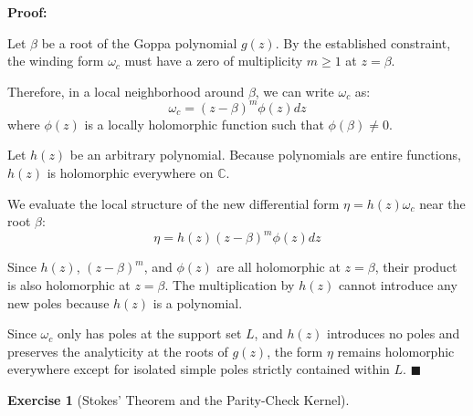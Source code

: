 \documentclass[11pt]{article}
\newtheorem{problem}{Exercise}
\begin{document}
	\begin{mdframed}[backgroundcolor=gray!5, linecolor=gray!50, linewidth=1pt]
		\textbf{Proof:}
		
		Let $\beta$ be a root of the Goppa polynomial $g(z)$. By the established constraint, the winding form $\omega_c$ must have a zero of multiplicity $m \geq 1$ at $z = \beta$. 
		
		Therefore, in a local neighborhood around $\beta$, we can write $\omega_c$ as:
		$$ \omega_c = (z - \beta)^m \phi(z) dz $$
		where $\phi(z)$ is a locally holomorphic function such that $\phi(\beta) \neq 0$.
		
		Let $h(z)$ be an arbitrary polynomial. Because polynomials are entire functions, $h(z)$ is holomorphic everywhere on $\mathbb{C}$. 
		
		We evaluate the local structure of the new differential form $\eta = h(z)\omega_c$ near the root $\beta$:
		$$ \eta = h(z) (z - \beta)^m \phi(z) dz $$
		
		Since $h(z)$, $(z-\beta)^m$, and $\phi(z)$ are all holomorphic at $z = \beta$, their product is also holomorphic at $z = \beta$. The multiplication by $h(z)$ cannot introduce any new poles because $h(z)$ is a polynomial. 
		
		Since $\omega_c$ only has poles at the support set $L$, and $h(z)$ introduces no poles and preserves the analyticity at the roots of $g(z)$, the form $\eta$ remains holomorphic everywhere except for isolated simple poles strictly contained within $L$. \hfill $\blacksquare$
	\end{mdframed}
	
	\newpage
	
	\begin{problem}[Stokes' Theorem and the Parity-Check Kernel]
	\end{problem}
	
\end{document}
